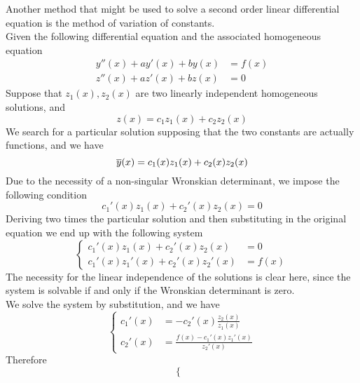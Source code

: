 \documentclass[../complete.tex]{subfiles}
\begin{document}
\begin{mtd}
	Another method that might be used to solve a second order linear differential equation is the method of variation of constants.\\
	Given the following differential equation and the associated homogeneous equation
	\begin{equation*}
		\begin{aligned}
			y''(x)+ay'(x)+by(x)&=f(x)\\
			z''(x)+az'(x)+bz(x)&=0
		\end{aligned}
	\end{equation*}
	Suppose that $z_1(x),z_2(x)$ are two linearly independent homogeneous solutions, and
	\begin{equation*}
		z(x)=c_1z_1(x)+c_2z_2(x)
	\end{equation*}
	We search for a particular solution supposing that the two constants are actually functions, and we have
	\begin{equation*}
		\overline{y}(x)=c_1(x)z_1(x)+c_2(x)z_2(x)
	\end{equation*}
	Due to the necessity of a non-singular Wronskian determinant, we impose the following condition
	\begin{equation*}
		c_1'(x)z_1(x)+c_2'(x)z_2(x)=0
	\end{equation*}
	Deriving two times the particular solution and then substituting in the original equation we end up with the following system
	\begin{equation*}
		\left\{\begin{aligned}
			c_1'(x)z_1(x)+c_2'(x)z_2(x)&=0\\
			c_1'(x)z_1'(x)+c_2'(x)z_2'(x)&=f(x)
		\end{aligned}\right.
	\end{equation*}
	The necessity for the linear independence of the solutions is clear here, since the system is solvable if and only if the Wronskian determinant is zero.\\
	We solve the system by substitution, and we have
	\begin{equation*}
		\left\{ \begin{aligned}
				c_1'(x)&=-c_2'(x)\frac{z_2(x)}{z_1(x)}\\
				c_2'(x)&=\frac{f(x)-c_1'(x)z_1'(x)}{z_2'(x)}
		\end{aligned}\right.
	\end{equation*}
	Therefore
	\begin{equation*}
		\left\{ \begin{aligned}

\end{aligned}
\end{equation*}
\end{mtd}
\end{document}
